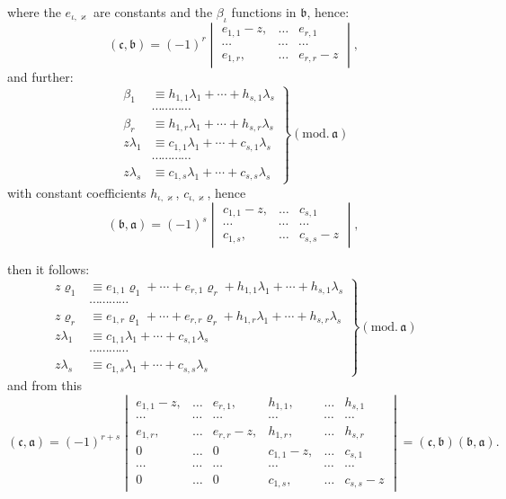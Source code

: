 \documentclass{article}
\begin{document}
where the $e_{\iota,\varkappa}$ are constants and the $\beta_{\iota}$ functions in $\mathfrak{b}$, hence:
\[ (\mathfrak{c}, \mathfrak{b}) = (-1)^{r} \begin{vmatrix} e_{1,1}-z, & \ldots & e_{r,1} \\ \cdots & \cdots & \cdots \\ e_{1,r}, & \ldots & e_{r,r}-z \end{vmatrix}, \]
and further:
\[ \left. \begin{aligned} \beta_{1} &\equiv h_{1,1}\lambda_{1} + \cdots + h_{s,1}\lambda_{s} \\ &\cdots\cdots\cdots\cdots \\ \beta_{r} &\equiv h_{1,r}\lambda_{1} + \cdots + h_{s,r}\lambda_{s} \\ z\lambda_{1} &\equiv c_{1,1}\lambda_{1} + \cdots + c_{s,1}\lambda_{s} \\ &\cdots\cdots\cdots\cdots \\ z\lambda_{s} &\equiv c_{1,s}\lambda_{1} + \cdots + c_{s,s}\lambda_{s} \end{aligned} \right\} (\text{mod.}\,\mathfrak{a}) \]
with constant coefficients $h_{\iota,\varkappa}$, $c_{\iota,\varkappa}$, hence
\[ (\mathfrak{b}, \mathfrak{a}) = (-1)^{s} \begin{vmatrix} c_{1,1}-z, & \ldots & c_{s,1} \\ \cdots & \cdots & \cdots \\ c_{1,s}, & \ldots & c_{s,s}-z \end{vmatrix}, \]

then it follows:
\[ \left. \begin{aligned} z\varrho_{1} &\equiv e_{1,1}\varrho_{1} + \cdots + e_{r,1}\varrho_{r} + h_{1,1}\lambda_{1} + \cdots + h_{s,1}\lambda_{s} \\ &\cdots\cdots\cdots\cdots \\ z\varrho_{r} &\equiv e_{1,r}\varrho_{1} + \cdots + e_{r,r}\varrho_{r} + h_{1,r}\lambda_{1} + \cdots + h_{s,r}\lambda_{s} \\ z\lambda_{1} &\equiv c_{1,1}\lambda_{1} + \cdots + c_{s,1}\lambda_{s} \\ &\cdots\cdots\cdots\cdots \\ z\lambda_{s} &\equiv c_{1,s}\lambda_{1} + \cdots + c_{s,s}\lambda_{s} \end{aligned} \right\} (\text{mod.}\,\mathfrak{a}) \]
and from this
\[ (\mathfrak{c}, \mathfrak{a}) = (-1)^{r+s} \begin{vmatrix} e_{1,1}-z, & \ldots & e_{r,1}, & h_{1,1}, & \ldots & h_{s,1} \\ \cdots & \cdots & \cdots & \cdots & \cdots & \cdots \\ e_{1,r}, & \ldots & e_{r,r}-z, & h_{1,r}, & \ldots & h_{s,r} \\ 0 & \ldots & 0 & c_{1,1}-z, & \ldots & c_{s,1} \\ \cdots & \cdots & \cdots & \cdots & \cdots & \cdots \\ 0 & \ldots & 0 & c_{1,s}, & \ldots & c_{s,s}-z \end{vmatrix} = (\mathfrak{c}, \mathfrak{b})(\mathfrak{b}, \mathfrak{a}). \]
\end{document}
